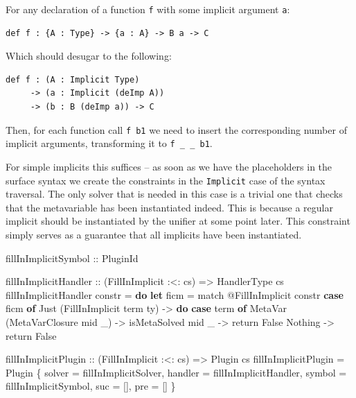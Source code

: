 \documentclass[
  sigconf,
  screen,
  review]{acmart}
\newenvironment{Shaded}{}{}
\newcommand{\DataTypeTok}[1]{\textcolor[rgb]{0.56,0.13,0.00}{#1}}
\newcommand{\FunctionTok}[1]{\textcolor[rgb]{0.02,0.16,0.49}{#1}}
\newcommand{\KeywordTok}[1]{\textcolor[rgb]{0.00,0.44,0.13}{\textbf{#1}}}
\newcommand{\NormalTok}[1]{#1}
\newcommand{\OperatorTok}[1]{\textcolor[rgb]{0.40,0.40,0.40}{#1}}
\newcommand{\OtherTok}[1]{\textcolor[rgb]{0.00,0.44,0.13}{#1}}
\begin{document}
For any declaration of a function \texttt{f} with some implicit argument
\texttt{a}:

\begin{verbatim}
def f : {A : Type} -> {a : A} -> B a -> C
\end{verbatim}

Which should desugar to the following:

\begin{verbatim}
def f : (A : Implicit Type)
     -> (a : Implicit (deImp A))
     -> (b : B (deImp a)) -> C
\end{verbatim}

Then, for each function call \texttt{f\ b1} we need to insert the
corresponding number of implicit arguments, transforming it to
\texttt{f\ \_\ \_\ b1}.

For simple implicits this suffices -- as soon as we have the
placeholders in the surface syntax we create the constraints in the
\texttt{Implicit} case of the syntax traversal. The only solver that is
needed in this case is a trivial one that checks that the metavariable
has been instantiated indeed. This is because a regular implicit should
be instantiated by the unifier at some point later. This constraint
simply serves as a guarantee that all implicits have been instantiated.

\begin{Shaded}
\begin{Highlighting}[]
\OtherTok{fillInImplicitSymbol ::} \DataTypeTok{PluginId}

\OtherTok{fillInImplicitHandler ::}\NormalTok{ (}\DataTypeTok{FillInImplicit} \OperatorTok{:\textless{}:}\NormalTok{ cs)}
                      \OtherTok{=\textgreater{}} \DataTypeTok{HandlerType}\NormalTok{ cs}
\NormalTok{fillInImplicitHandler constr }\OtherTok{=} \KeywordTok{do}
  \KeywordTok{let}\NormalTok{ ficm }\OtherTok{=}\NormalTok{ match }\OperatorTok{@}\DataTypeTok{FillInImplicit}\NormalTok{ constr}
  \KeywordTok{case}\NormalTok{ ficm }\KeywordTok{of}
    \DataTypeTok{Just}\NormalTok{ (}\DataTypeTok{FillInImplicit}\NormalTok{ term ty) }\OtherTok{{-}\textgreater{}} \KeywordTok{do}
      \KeywordTok{case}\NormalTok{ term }\KeywordTok{of}
        \DataTypeTok{MetaVar}\NormalTok{ (}\DataTypeTok{MetaVarClosure}\NormalTok{ mid \_) }\OtherTok{{-}\textgreater{}}
\NormalTok{          isMetaSolved mid}
\NormalTok{        \_ }\OtherTok{{-}\textgreater{}} \FunctionTok{return} \DataTypeTok{False}
    \DataTypeTok{Nothing} \OtherTok{{-}\textgreater{}} \FunctionTok{return} \DataTypeTok{False}

\OtherTok{fillInImplicitPlugin ::}\NormalTok{ (}\DataTypeTok{FillInImplicit} \OperatorTok{:\textless{}:}\NormalTok{ cs)}
                     \OtherTok{=\textgreater{}} \DataTypeTok{Plugin}\NormalTok{ cs}
\NormalTok{fillInImplicitPlugin }\OtherTok{=} \DataTypeTok{Plugin}\NormalTok{ \{}
\NormalTok{  solver }\OtherTok{=}\NormalTok{ fillInImplicitSolver,}
\NormalTok{  handler }\OtherTok{=}\NormalTok{ fillInImplicitHandler,}
\NormalTok{  symbol }\OtherTok{=}\NormalTok{ fillInImplicitSymbol,}
\NormalTok{  suc }\OtherTok{=}\NormalTok{ [],}
\NormalTok{  pre }\OtherTok{=}\NormalTok{ []}
\NormalTok{  \}}
\end{Highlighting}
\end{Shaded}
\end{document}
